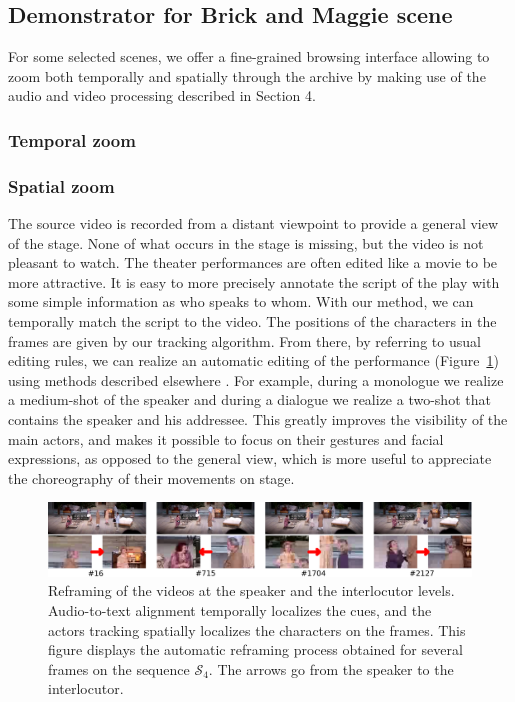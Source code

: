 \documentclass[conference]{IEEEtran}
\begin{document}
\subsection{Demonstrator for Brick and Maggie scene}
For some selected scenes, we offer a fine-grained browsing interface allowing to zoom both temporally and spatially
through the archive by making use of the audio and video processing described in Section 4.  

\subsubsection{Temporal zoom}

\subsubsection{Spatial zoom}
The source video  is recorded from a distant viewpoint  to provide  a general  view of the stage.  None of what occurs in the stage is missing, but the video is not pleasant to watch.  The theater performances are often edited like a movie to be more attractive.   It is easy to more precisely annotate the script of the play with some simple information as who speaks to whom. With our method, we can temporally match the script to the video.  The positions of the characters in the frames are given by our tracking algorithm.  From there, by referring to usual editing rules, we can realize an automatic editing of the performance (Figure~\ref{fig_speaker}) using methods described elsewhere \cite{Gandhi14}.  For example, during a monologue we realize a medium-shot of the speaker and during a dialogue we realize a two-shot that contains the speaker and his addressee. This greatly improves the visibility of the main actors, and makes it possible to focus on their gestures and facial expressions, as opposed to the general view, which is more useful to appreciate the choreography of their movements on stage.

\begin{figure}[tp]
\centering
\includegraphics[width=\textwidth]{speakers2}
\caption{Reframing of the videos at the speaker and the interlocutor levels. Audio-to-text alignment temporally localizes the cues, and the actors tracking spatially localizes the characters on the frames. 
This figure displays the automatic reframing process obtained for several frames on the sequence $\mathcal{S}_4$. The arrows go from the speaker to the interlocutor.}
\label{fig_speaker}
\end{figure}
\end{document}
